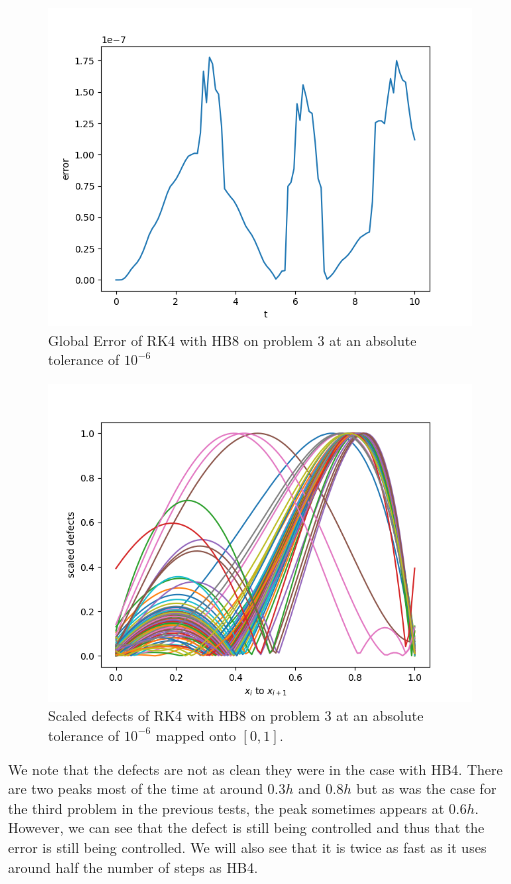 \begin{figure}[H]
\centering
\includegraphics[width=0.7\linewidth]{./figures/rk4_with_hb8_p3_global_error}
\caption{Global Error of RK4 with HB8 on problem 3 at an absolute tolerance of $10^{-6}$}
\label{fig:rk4_with_hb8_p3_global_error}
\end{figure}

\begin{figure}[H]
\centering
\includegraphics[width=0.7\linewidth]{./figures/rk4_with_hb8_p3_scaled_defects}
\caption{Scaled defects of RK4 with HB8 on problem 3 at an absolute tolerance of $10^{-6}$ mapped onto $[0, 1]$.}
\label{fig:rk4_with_hb8_p3_scaled_defects}
\end{figure}

We note that the defects are not as clean they were in the case with HB4. There are two peaks most of the time at around $0.3h$ and $0.8h$ but as was the case for the third problem in the previous tests, the peak sometimes appears at $0.6h$. However, we can see that the defect is still being controlled and thus that the error is still being controlled. We will also see that it is twice as fast as it uses around half the number of steps as HB4.

